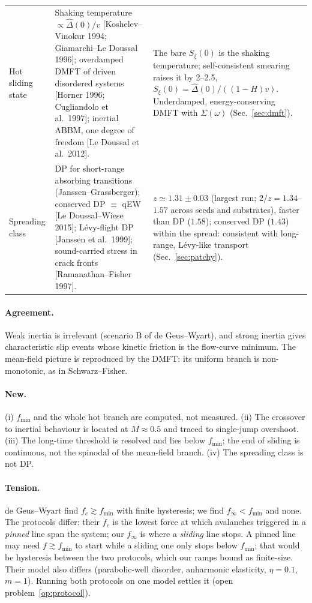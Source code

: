 \documentclass[10pt,a4paper]{article}
\begin{document}
\begin{center}
\begin{tabular}{p{2.6cm}p{6.4cm}p{6.6cm}}
Hot sliding state & Shaking temperature $\propto\hat\Delta(0)/v$ [Koshelev--Vinokur 1994; Giamarchi--Le Doussal 1996]; overdamped DMFT of driven disordered systems [Horner 1996; Cugliandolo et al.\ 1997]; inertial ABBM, one degree of freedom [Le Doussal et al.\ 2012]. & The bare $S_\xi(0)$ is the shaking temperature; self-consistent smearing raises it by 2--2.5, $S_\xi(0)=\hat\Delta(0)/((1-H)v)$. Underdamped, energy-conserving DMFT with $\Sigma(\omega)$ (Sec.~\ref{sec:dmft}). \\
Spreading class & DP for short-range absorbing transitions (Janssen--Grassberger); conserved DP $\equiv$ qEW [Le Doussal--Wiese 2015]; L\'evy-flight DP [Janssen et al.\ 1999]; sound-carried stress in crack fronts [Ramanathan--Fisher 1997]. & $z\simeq1.31\pm0.03$ (largest run; $2/z=1.34$--$1.57$ across seeds and substrates), faster than DP ($1.58$); conserved DP ($1.43$) within the spread: consistent with long-range, L\'evy-like transport (Sec.~\ref{sec:patchy}). \\
\bottomrule
\end{tabular}
\end{center}

\paragraph{Agreement.} Weak inertia is irrelevant (scenario B of de Geus--Wyart), and strong inertia gives characteristic slip events whose kinetic friction is the flow-curve minimum. The mean-field picture is reproduced by the DMFT: its uniform branch is non-monotonic, as in Schwarz--Fisher.

\paragraph{New.} (i) $f_{\min}$ and the whole hot branch are computed, not measured. (ii) The crossover to inertial behaviour is located at $M\approx0.5$ and traced to single-jump overshoot. (iii) The long-time threshold is resolved and lies below $f_{\min}$; the end of sliding is continuous, not the spinodal of the mean-field branch. (iv) The spreading class is not DP.

\paragraph{Tension.} de Geus--Wyart find $f_c\gtrsim f_{\min}$ with finite hysteresis; we find $f_\infty<f_{\min}$ and none. The protocols differ: their $f_c$ is the lowest force at which avalanches triggered in a \emph{pinned} line span the system; our $f_\infty$ is where a \emph{sliding} line stops. A pinned line may need $f\gtrsim f_{\min}$ to start while a sliding one only stops below $f_{\min}$; that would be hysteresis between the two protocols, which our ramps bound as finite-size. Their model also differs (parabolic-well disorder, anharmonic elasticity, $\eta=0.1$, $m=1$). Running both protocols on one model settles it (open problem~\ref{op:protocol}).
\end{document}
